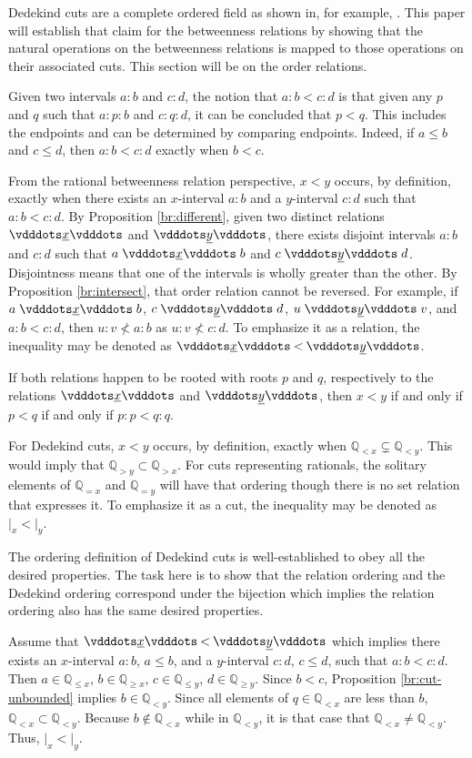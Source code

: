 \documentclass[12pt]{article}
\newcommand{\qcut}[2][x]{\ensuremath{\mathbb{Q}_{#2 #1}}}
\newcommand{\qlt}[1][x]{\qcut[#1]{<}}
\newcommand{\qeq}[1][x]{\qcut[#1]{=}}
\newcommand{\qgt}[1][x]{\qcut[#1]{>}}
\newcommand{\qgeq}[1][x]{\qcut[#1]{\geq}}
\newcommand{\qleq}[1][x]{\qcut[#1]{\leq}}
\newcommand{\cut}[1][x]{{\vert}_{#1} }
\newcommand{\yrel}{\xrel[y]}
\begin{document}
Dedekind cuts are a complete ordered field as shown in, for example, \cite{rudin}. This paper will establish that claim for the betweenness relations by showing that the natural operations on the betweenness relations is mapped to those operations on their associated cuts. This section will be on the order relations.  

Given two intervals $a:b$ and $c:d$, the notion that $a:b < c:d$ is that given any $p$ and $q$ such that $a:p:b$ and $c:q:d$, it can be concluded that $p < q$. This includes the endpoints and can be determined by comparing endpoints. Indeed, if $a\leq b$ and $c \leq d$, then $a:b < c:d$ exactly when $b < c$. 

From the rational betweenness relation perspective, $x < y$ occurs, by definition, exactly when there exists an $x$-interval $a:b$ and a $y$-interval $c:d$ such that $a:b < c:d$. By Proposition \ref{br:different}, given two distinct relations $\xrel$ and $\yrel$, there exists disjoint intervals $a:b$ and $c:d$ such that $a \xrel b$ and $c \yrel d$. Disjointness means that one of the intervals is wholly greater than the other. By Proposition \ref{br:intersect}, that order relation cannot be reversed. For example, if $a \xrel b$, $c \xrel[y] d$, $u \yrel v$, and $a:b < c:d$, then $u:v \nless a:b$ as $u:v \nless c:d$.  To emphasize it as a relation, the inequality may be denoted as $\xrel  \:<\: \yrel$. 

If both relations happen to be  rooted with roots $p$ and $q$, respectively to the relations $\xrel$ and $\yrel$, then $x<y$ if and only if $p < q$ if and only if $p:p < q:q$. 

For Dedekind cuts, $x < y$ occurs, by definition, exactly when $\qlt \subsetneq \qlt[y]$. This would imply that $\qgt[y] \subset \qgt$. For cuts representing rationals, the solitary elements of $\qeq$ and $\qeq[y]$ will have that ordering though there is no set relation that expresses it. To emphasize it as a cut, the inequality may be denoted as $\cut < \cut[y]$.

The ordering definition of Dedekind cuts is well-established to obey all the desired properties. The task here is to show that the relation ordering and the Dedekind ordering correspond under the bijection which implies the relation ordering also has the same desired properties. 

Assume that $\xrel  \:<\: \yrel$ which implies there exists an $x$-interval $a:b$, $a \leq b$,  and a $y$-interval $c:d$, $c \leq d$, such that $a:b < c:d$. Then $a \in \qleq$, $b \in \qgeq$, $c \in \qleq[y]$, $d \in \qgeq[y]$. Since $ b< c$, Proposition \ref{br:cut-unbounded} implies $b \in \qlt[y]$. Since all elements of $q \in \qlt$ are less than $b$, $\qlt \subset \qlt[y]$. Because $b\notin \qlt$ while in $\qlt[y]$, it is that case that $\qlt \neq \qlt[y]$. Thus,  $\cut < \cut[y]$. 
\end{document}
